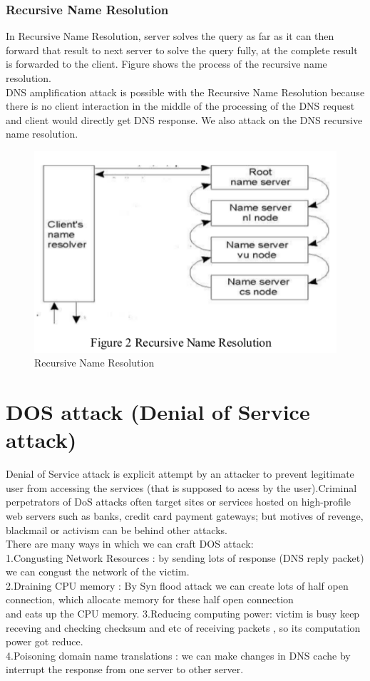\documentclass[11pt]{article}
\begin{document}
\subsubsection{Recursive Name Resolution}
In Recursive Name Resolution, server solves the query as far as it can then forward that result to next server to solve the query fully, at the complete result is forwarded to the client. Figure shows the process of the recursive name resolution. \\
DNS amplification attack is possible with the Recursive Name Resolution because there is no client interaction in the middle of the processing of the DNS request and client would directly get DNS response. We also attack on the DNS recursive name resolution.
\begin{figure}[H]
\includegraphics[scale=0.6]{rec.png}
\caption{Recursive Name Resolution}
\end{figure}

\section{DOS attack (Denial of Service attack)}
Denial of Service attack is explicit attempt by an attacker to prevent legitimate user from accessing the services (that is supposed to acess by the user).Criminal perpetrators of DoS attacks often target sites or services hosted on high-profile web servers such as banks, credit card payment gateways; but motives of revenge, blackmail or activism can be behind other attacks.\\
There are many ways in which we can craft DOS attack:\\
1.Congusting Network Resources : by sending lots of response (DNS reply packet) we can congust the network of the victim.\\
2.Draining CPU memory : By Syn flood attack we can create lots of half open connection, which allocate memory for these half open connection\\ and eats up the CPU memory.
3.Reducing computing power: victim is busy keep receving and checking checksum and etc of receiving packets , so its computation power got reduce.\\
4.Poisoning domain name translations : we can make changes in DNS cache by interrupt the response from one server to other server.\\
\end{document}

